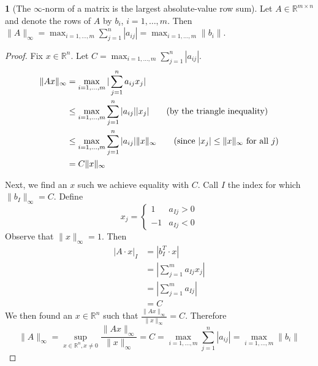 \documentclass[12pt]{article}
\theoremstyle{definition}
\newtheorem{theorem}{\color{ForestGreen}{\textbf{Theorem}}}
\newcommand{\R}{\mathbb{R}}
\newcommand{\norm}[1]{\lVert#1\rVert}
\theoremstyle{definition}
\begin{document}
\begin{theorem}[The $\infty$-norm of a matrix is the largest absolute-value row sum]
Let $A \in \R^{m \times n }$ and denote the rows of $A$ by $b_i$, $i=1, \ldots, m$. Then $\norm{A}_{\infty} = \max_{i=1, \ldots, m} \sum_{j=1}^{n} |a_{ij}| =  \max_{i=1, \ldots, m} \norm{b_i}$.
\end{theorem}
\begin{proof}
Fix $x \in \R^n$. Let $C = \max_{i=1, \ldots, m} \sum_{j=1}^{n} |a_{ij}|$.
\begin{align*}
	\norm{Ax}_{\infty} &= \max_{i=1,\ldots,m} |\sum_{j=1}^n a_{ij} x_j| \\
	&\leq \max_{i=1,\ldots,m} \sum_{j=1}^n |a_{ij}| |x_j| \tag{by the triangle inequality} \\
	&\leq  \max_{i=1,\ldots,m} \sum_{j=1}^n |a_{ij}| \norm{x}_{\infty} \tag{since $|x_j| \leq \norm{x}_{\infty}$ for all $j$}\\
	&= C \norm{x}_{\infty}
\end{align*}

Next, we find an $x$ such we achieve equality with $C$. Call $I$ the index for which $\norm{b_I}_\infty = C$. Define
\begin{equation}
	x_j = 
	\begin{cases} 
      1 & a_{Ij} > 0 \\
      -1 & a_{Ij} < 0
   \end{cases}
\end{equation}
Observe that $\norm{x}_\infty = 1$. Then
\begin{align*}
	|A\cdot x|_I &= |b_I^T \cdot x| \\
	&=  |\sum_{j=1}^m a_{Ij} x_j | \\
	&= |\sum_{j=1}^m a_{Ij}| \\
	&= C
\end{align*}
We then found an $x \in \R^n$ such that $\frac{\norm{Ax}_\infty}{\norm{x}_\infty} = C$. Therefore 
\begin{equation}
	\norm{A}_\infty = \sup_{x \in \R^n, x\neq 0} \frac{\norm{Ax}_\infty}{\norm{x}_\infty} = C = \max_{i=1, \ldots, m} \sum_{j=1}^{n} |a_{ij}| =  \max_{i=1, \ldots, m} \norm{b_i}
\end{equation}
\end{proof}
\end{document}
